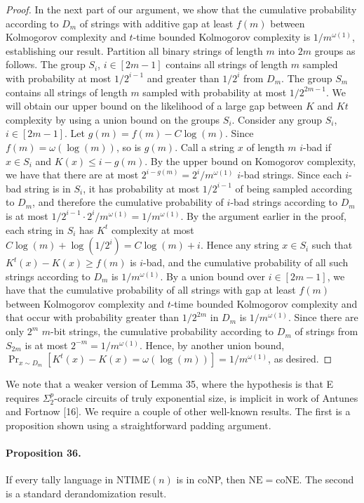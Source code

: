 \documentclass[10pt,a4paper]{article}
\begin{document}
\begin{proof}
In the next part of our argument, we show that the cumulative probability according to $D_m$ of strings with additive gap at least $f(m)$ between Kolmogorov complexity and $t$-time bounded Kolmogorov complexity is $1/m^{\omega(1)}$, establishing our result.
Partition all binary strings of length $m$ into $2m$ groups as follows. The group $S_i$, $i\in[2m-1]$ contains all strings of length $m$ sampled with probability at most $1/2^{i-1}$ and greater than $1/2^i$ from $D_m$. The group $S_m$ contains all strings of length $m$ sampled with probability at most $1/2^{2m-1}$. We will obtain our upper bound on the likelihood of a large gap between $K$ and $Kt$ complexity by using a union bound on the groups $S_i$.
Consider any group $S_i$, $i\in[2m-1]$. Let $g(m)=f(m)-C\log(m)$. Since $f(m)=\omega(\log(m))$, so is $g(m)$. Call a string $x$ of length $m$ $i$-bad if $x\in S_i$ and $K(x)\le i-g(m)$. By the upper bound on Komogorov complexity, we have that there are at most $2^{i-g(m)}=2^i/m^{\omega(1)}$ $i$-bad strings. Since each $i$-bad string is in $S_i$, it has probability at most $1/2^{i-1}$ of being sampled according to $D_m$, and therefore the cumulative probability of $i$-bad strings according to $D_m$ is at most $1/2^{i-1}\cdot2^i/m^{\omega(1)}=1/m^{\omega(1)}$.
By the argument earlier in the proof, each string in $S_i$ has $K^t$ complexity at most $C\log(m)+\log(1/2^i)=C\log(m)+i$. Hence any string $x\in S_i$ such that $K^t(x)-K(x)\ge f(m)$ is $i$-bad, and the cumulative probability of all such strings according to $D_m$ is $1/m^{\omega(1)}$. By a union bound over $i\in[2m-1]$, we have that the cumulative probability of all strings with gap at least $f(m)$ between Kolmogorov complexity and $t$-time bounded Kolmogorov complexity and that occur with probability greater than $1/2^{2m}$ in $D_m$ is $1/m^{\omega(1)}$. Since there are only $2^m$ $m$-bit strings, the cumulative probability according to $D_m$ of strings from $S_{2m}$ is at most $2^{-m}=1/m^{\omega(1)}$. Hence, by another union bound, $\Pr_{x\sim D_m}[K^t(x)-K(x)=\omega(\log(m))]=1/m^{\omega(1)}$, as desired.\end{proof}
We note that a weaker version of Lemma 35, where the hypothesis is that E requires $\Sigma_2^p$-oracle circuits of truly exponential size, is implicit in work of Antunes and Fortnow [16]. We require a couple of other well-known results. The first is a proposition shown using a straightforward padding argument.
\paragraph{Proposition 36.} If every tally language in $\mathrm{NTIME}(n)$ is in coNP, then $\mathrm{NE}=\mathrm{coNE}$.
The second is a standard derandomization result.
\end{document}
